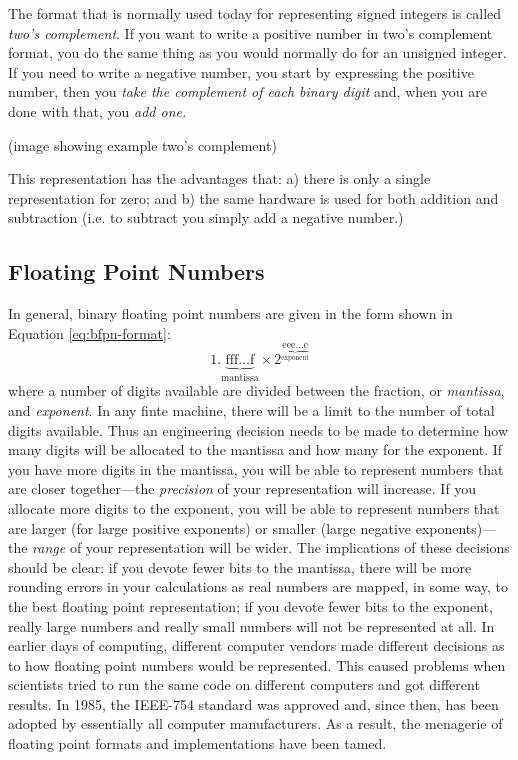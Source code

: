 The format that is normally used today for representing signed integers is called \emph{two's complement}.  If you want to write a positive number in two's complement format, you do the same thing as you would normally do for an unsigned integer. If you need to write a negative number, you start by expressing the positive number, then you \emph{take the complement of each binary digit} and, when you are done with that, you \emph{add one.}

\vspace{0.25cm}
\noindent (image showing example two's complement)
\vspace{0.25cm}

This representation has the advantages that: a) there is only a single representation for zero; and b) the same hardware is used for both addition and subtraction (i.e. to subtract you simply add a negative number.)

\subsection{Floating Point Numbers}
In general, binary floating point numbers are given in the form shown in Equation \ref{eq:bfpn-format}:
\begin{equation}
1.\underbrace{\text{fff}\dots\text{f}}_{\text{mantissa}} \times 2^{\underbrace{\text{eee}\dots\text{e}}_{\text{exponent}}}
\label{eq:bfpn-format}
\end{equation}
where a number of digits available are divided between the fraction, or \emph{mantissa}, and \emph{exponent}.  In any finte machine, there will be a limit to the number of total digits available.  Thus an engineering decision needs to be made to determine how many digits will be allocated to the mantissa and how many for the exponent.  If you have more digits in the mantissa, you will be able to represent numbers that are closer together---the \emph{precision} of your representation will increase.  If you allocate more digits to the exponent, you will be able to represent numbers that are larger (for large positive exponents) or smaller (large negative exponents)---the \emph{range} of your representation will be wider.  The implications of these decisions should be clear: if you devote fewer bits to the mantissa, there will be more rounding errors in your calculations as real numbers are mapped, in some way, to the best floating point representation; if you devote fewer bits to the exponent, really large numbers and really small numbers will not be represented at all.  In earlier days of computing, different computer vendors made different decisions as to how floating point numbers would be represented.\cite{moler_fp1}  This caused problems when scientists tried to run the same code on different computers and got different results.  In 1985, the IEEE-754 standard was approved and, since then, has been adopted by essentially all computer manufacturers.  As a result, the menagerie of floating point formats and implementations have been tamed.

